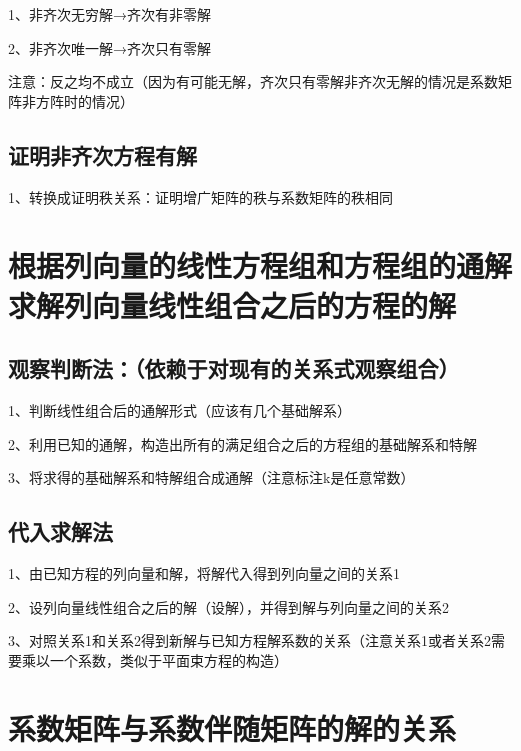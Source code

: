 1、非齐次无穷解→齐次有非零解

2、非齐次唯一解→齐次只有零解

注意：反之均不成立（因为有可能无解，齐次只有零解非齐次无解的情况是系数矩阵非方阵时的情况）



\subsection{证明非齐次方程有解}

1、转换成证明秩关系：证明增广矩阵的秩与系数矩阵的秩相同

\section{根据列向量的线性方程组和方程组的通解求解列向量线性组合之后的方程的解}



\subsection{观察判断法：（依赖于对现有的关系式观察组合）}

1、判断线性组合后的通解形式（应该有几个基础解系）

2、利用已知的通解，构造出所有的满足组合之后的方程组的基础解系和特解

3、将求得的基础解系和特解组合成通解（注意标注k是任意常数）



\subsection{代入求解法}

1、由已知方程的列向量和解，将解代入得到列向量之间的关系1

2、设列向量线性组合之后的解（设解），并得到解与列向量之间的关系2

3、对照关系1和关系2得到新解与已知方程解系数的关系（注意关系1或者关系2需要乘以一个系数，类似于平面束方程的构造）

\section{系数矩阵与系数伴随矩阵的解的关系}

